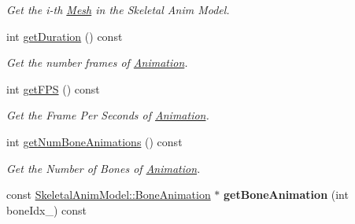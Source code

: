 \begin{DoxyCompactItemize}
\begin{DoxyCompactList}\small\item\em Get the i-\/th \hyperlink{class_magnum_1_1_skeletal_anim_model_1_1_mesh}{Mesh} in the Skeletal Anim Model. \end{DoxyCompactList}\item 
int \hyperlink{class_magnum_1_1_skeletal_anim_model_1_1_resource_a4ed733e7395806c86596a8403f795ead}{get\+Duration} () const 
\begin{DoxyCompactList}\small\item\em Get the number frames of \hyperlink{class_magnum_1_1_skeletal_anim_model_1_1_animation}{Animation}. \end{DoxyCompactList}\item 
int \hyperlink{class_magnum_1_1_skeletal_anim_model_1_1_resource_a8883d1258f9b184515cda8284b94b63c}{get\+F\+PS} () const 
\begin{DoxyCompactList}\small\item\em Get the Frame Per Seconds of \hyperlink{class_magnum_1_1_skeletal_anim_model_1_1_animation}{Animation}. \end{DoxyCompactList}\item 
int \hyperlink{class_magnum_1_1_skeletal_anim_model_1_1_resource_ac3a6b940d45fbb71cbb62aa08c73b412}{get\+Num\+Bone\+Animations} () const 
\begin{DoxyCompactList}\small\item\em Get the Number of Bones of \hyperlink{class_magnum_1_1_skeletal_anim_model_1_1_animation}{Animation}. \end{DoxyCompactList}\item 
const \hyperlink{class_magnum_1_1_skeletal_anim_model_1_1_bone_animation}{Skeletal\+Anim\+Model\+::\+Bone\+Animation} $\ast$ {\bfseries get\+Bone\+Animation} (int bone\+Idx\+\_\+) const \hypertarget{class_magnum_1_1_skeletal_anim_model_1_1_resource_a72bc15358afefa0bd80284201e5e006c}{}\label{class_magnum_1_1_skeletal_anim_model_1_1_resource_a72bc15358afefa0bd80284201e5e006c}


\end{DoxyCompactItemize}
